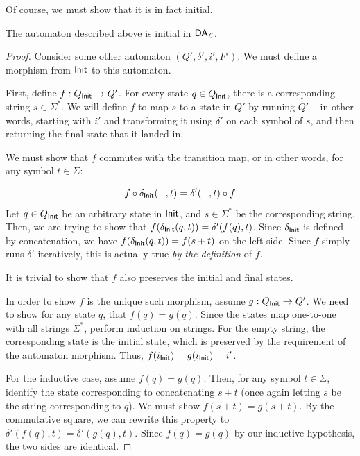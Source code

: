 Of course, we must show that it is in fact initial.

\begin{theorem}
    The automaton described above is initial in $\mathsf{DA}_\mathcal L$.
\end{theorem}

\begin{proof}
  Consider some other automaton $(Q', \delta', i', F')$.
  We must define a morphism from $\mathsf{Init}$ to this automaton.

  First, define $f : Q_{\mathsf{Init}} \rightarrow Q'$.
  For every state $q \in Q_{\mathsf{Init}}$, there is a corresponding string $s \in \Sigma^*$.
  We will define $f$ to map $s$ to a state in $Q'$ by running $Q'$ -- in other words, starting with $i'$ and transforming it using $\delta'$ on each symbol of $s$, and then returning the final state that it landed in.

  We must show that $f$ commutes with the transition map, or in other words, for any symbol $t \in \Sigma$:
  
  \begin{equation}
  f \circ \delta_{\mathsf{Init}} (-, t) = \delta' (-, t) \circ f
  \end{equation}
  Let $q \in Q_{\mathsf{Init}}$ be an arbitrary state in $\mathsf{Init}$, and $s \in \Sigma^*$ be the corresponding string.
  Then, we are trying to show that $f(\delta_{\mathsf{Init}} (q, t)) = \delta'(f(q), t)$.
  Since $\delta_{\mathsf{Init}}$ is defined by concatenation, we have $f(\delta_{\mathsf{Init}} (q, t)) = f(s + t)$ on the left side.
  Since $f$ simply runs $\delta'$ iteratively, this is actually true \emph{by the definition} of $f$.

  It is trivial to show that $f$ also preserves the initial and final states.

  In order to show $f$ is the unique such morphism, assume $g : Q_{\mathsf{Init}} \rightarrow Q'$.
  We need to show for any state $q$, that $f(q) = g(q)$.
  Since the states map one-to-one with all strings $\Sigma^*$, perform induction on strings.
  For the empty string, the corresponding state is the initial state, which is preserved by the requirement of the automaton morphism.
  Thus, $f(i_{\mathsf{Init}}) = g(i_{\mathsf{Init}}) = i'$.

  For the inductive case, assume $f(q) = g(q)$. Then, for any symbol $t \in \Sigma$, identify the state corresponding to concatenating $s + t$ (once again letting $s$ be the string corresponding to $q$).
  We must show $f(s + t) = g(s + t)$.
  By the commutative square, we can rewrite this property to $\delta'(f(q), t) = \delta'(g(q), t)$.
  Since $f(q) = g(q)$ by our inductive hypothesis, the two sides are identical.
\end{proof}

